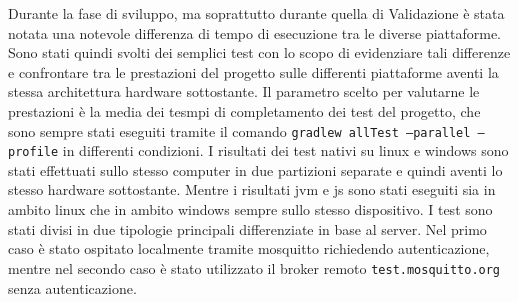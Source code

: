 \documentclass[12pt,a4paper,openright,twoside]{book}
\begin{document}
Durante la fase di sviluppo, ma soprattutto durante quella di Validazione è stata notata una notevole differenza di tempo di esecuzione tra le diverse piattaforme. 
Sono stati quindi svolti dei semplici test con lo scopo di evidenziare tali differenze e confrontare tra le prestazioni del progetto sulle differenti piattaforme 
aventi la stessa architettura hardware sottostante.
Il parametro scelto per valutarne le prestazioni è la media dei tesmpi di completamento dei test del progetto,
 che sono sempre stati eseguiti tramite il comando \texttt{gradlew allTest --parallel --profile} in differenti condizioni.
I risultati dei test nativi su linux e windows sono stati effettuati sullo stesso computer in due partizioni separate e quindi aventi lo stesso hardware sottostante. 
Mentre i risultati jvm e js sono stati eseguiti sia in ambito linux che in ambito windows sempre sullo stesso dispositivo.
I test sono stati divisi in due tipologie principali differenziate in base al server. Nel primo caso è stato ospitato localmente tramite mosquitto richiedendo autenticazione, 
mentre nel secondo caso è stato utilizzato il broker remoto \texttt{test.mosquitto.org} senza autenticazione.
\end{document}
